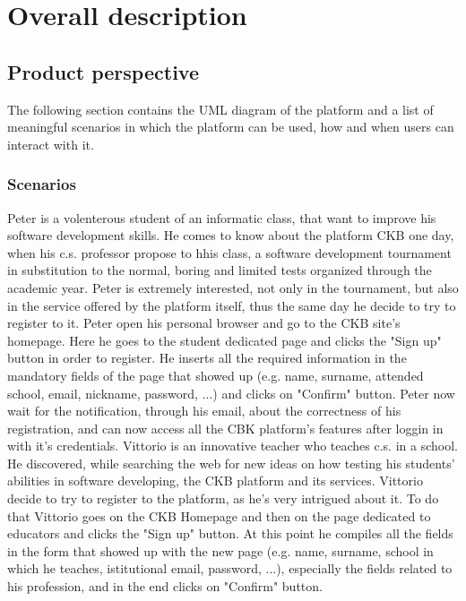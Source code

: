 \documentclass{article}
\newcounter{subsubsubsection}[subsubsection]
\begin{document}
{\newpage

\pagestyle{OverallDescriptionStyle}

\section{Overall description}
    \subsection{Product perspective}
        The following section contains the UML diagram of the platform and a list of meaningful scenarios in which the platform can be used, how and when users can interact with it.
        \subsubsection{Scenarios}
                Peter is a volenterous student of an informatic class, that want to improve his software development skills. He comes to know about the platform CKB one day, when his c.s. professor propose to hhis class, a software development tournament in substitution to the normal, boring and limited tests organized through the academic year.
                Peter is extremely interested, not only in the tournament, but also in the service offered by the platform itself, thus the same day he decide to try to register to it.
                Peter open his personal browser and go to the CKB site's homepage. Here he goes to the student dedicated page and clicks the "Sign up" button in order to register. He inserts all the required information in the mandatory fields of the page that showed up (e.g. name, surname, attended school, email, nickname, password, ...) and clicks on "Confirm" button.
                Peter now wait for the notification, through his email, about the correctness of his registration, and can now access all the CBK platform's features after loggin in with it's credentials.
                Vittorio is an innovative teacher who teaches c.s. in a school. He discovered, while searching the web for new ideas on how testing his students' abilities in software developing, the CKB platform and its services.
                Vittorio decide to try to register to the platform, as he's very intrigued about it. To do that Vittorio goes on the CKB Homepage and then on the page dedicated to educators and clicks the "Sign up" button. At this point he compiles all the fields in the form that showed up with the new page (e.g. name, surname, school in which he teaches, istitutional email, password, ...), especially the fields related to his profession, and in the end clicks on "Confirm" button.
}
\end{document}
